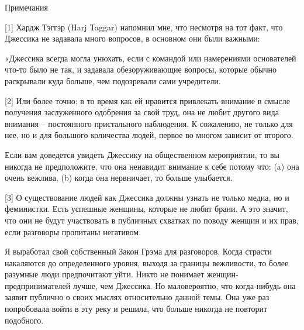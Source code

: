 \documentclass[ebook,12pt,oneside,openany]{memoir}
\begin{document}
Примечания

[1] Хардж Тэггэр (Harj Taggar) напомнил мне, что несмотря на тот факт,
что Джессика не задавала много вопросов, в основном они были важными:

«Джессика всегда могла унюхать, если с командой или намерениями
основателей что-то было не так, и задавала обезоруживающие вопросы,
которые обычно раскрывали куда больше, чем подозревали сами
учредители.

[2] Или более точно: в то время как ей нравится привлекать внимание в
смысле получения заслуженного одобрения за свой труд, она не любит
другого вида внимания – постоянного пристального наблюдения. К
сожалению, не только для нее, но и для большого количества людей,
первое во многом зависит от второго.

Если вам доведется увидеть Джессику на общественном мероприятии, то вы
никогда не предположите, что она ненавидит внимание к себе потому что:
(a) она очень вежлива, (b) когда она нервничает, то больше улыбается.

[3] О существование людей как Джессика должны узнать не только медиа,
но и феминистки. Есть успешные женщины, которые не любят брани. А это
значит, что они не будут участвовать в публичных схватках по поводу
женщин и их прав, если разговоры пропитаны негативом.

Я выработал свой собственный Закон Грэма для разговоров. Когда страсти
накаляются до определенного уровня, выходя за границы вежливости, то
более разумные люди предпочитают уйти. Никто не понимает
женщин-предпринимателей лучше, чем Джессика. Но маловероятно, что
когда-нибудь она заявит публично о своих мыслях относительно данной
темы. Она уже раз попробовала войти в эту реку и решила, что больше
никогда не повторит подобного.
\end{document}
